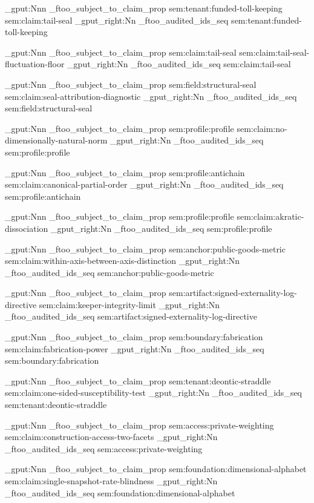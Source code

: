 \prop_gput:Nnn \g_ftoo_subject_to_claim_prop { sem:tenant:funded-toll-keeping } { sem:claim:tail-seal }
\seq_gput_right:Nn \g_ftoo_audited_ids_seq { sem:tenant:funded-toll-keeping }

\prop_gput:Nnn \g_ftoo_subject_to_claim_prop { sem:claim:tail-seal } { sem:claim:tail-seal-fluctuation-floor }
\seq_gput_right:Nn \g_ftoo_audited_ids_seq { sem:claim:tail-seal }

\prop_gput:Nnn \g_ftoo_subject_to_claim_prop { sem:field:structural-seal } { sem:claim:seal-attribution-diagnostic }
\seq_gput_right:Nn \g_ftoo_audited_ids_seq { sem:field:structural-seal }

\prop_gput:Nnn \g_ftoo_subject_to_claim_prop { sem:profile:profile } { sem:claim:no-dimensionally-natural-norm }
\seq_gput_right:Nn \g_ftoo_audited_ids_seq { sem:profile:profile }

\prop_gput:Nnn \g_ftoo_subject_to_claim_prop { sem:profile:antichain } { sem:claim:canonical-partial-order }
\seq_gput_right:Nn \g_ftoo_audited_ids_seq { sem:profile:antichain }

\prop_gput:Nnn \g_ftoo_subject_to_claim_prop { sem:profile:profile } { sem:claim:akratic-dissociation }
\seq_gput_right:Nn \g_ftoo_audited_ids_seq { sem:profile:profile }

\prop_gput:Nnn \g_ftoo_subject_to_claim_prop { sem:anchor:public-goods-metric } { sem:claim:within-axis-between-axis-distinction }
\seq_gput_right:Nn \g_ftoo_audited_ids_seq { sem:anchor:public-goods-metric }

\prop_gput:Nnn \g_ftoo_subject_to_claim_prop { sem:artifact:signed-externality-log-directive } { sem:claim:keeper-integrity-limit }
\seq_gput_right:Nn \g_ftoo_audited_ids_seq { sem:artifact:signed-externality-log-directive }

\prop_gput:Nnn \g_ftoo_subject_to_claim_prop { sem:boundary:fabrication } { sem:claim:fabrication-power }
\seq_gput_right:Nn \g_ftoo_audited_ids_seq { sem:boundary:fabrication }

\prop_gput:Nnn \g_ftoo_subject_to_claim_prop { sem:tenant:deontic-straddle } { sem:claim:one-sided-susceptibility-test }
\seq_gput_right:Nn \g_ftoo_audited_ids_seq { sem:tenant:deontic-straddle }

\prop_gput:Nnn \g_ftoo_subject_to_claim_prop { sem:access:private-weighting } { sem:claim:construction-access-two-facets }
\seq_gput_right:Nn \g_ftoo_audited_ids_seq { sem:access:private-weighting }

\prop_gput:Nnn \g_ftoo_subject_to_claim_prop { sem:foundation:dimensional-alphabet } { sem:claim:single-snapshot-rate-blindness }
\seq_gput_right:Nn \g_ftoo_audited_ids_seq { sem:foundation:dimensional-alphabet }

